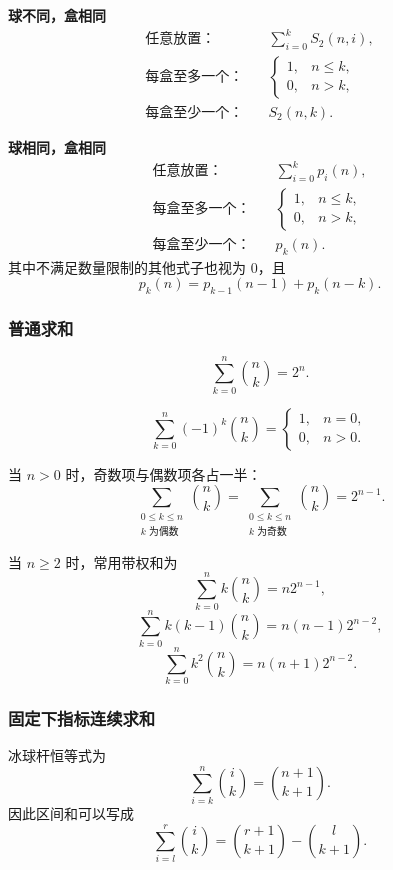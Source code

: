 \textbf{球不同，盒相同}
\[
\begin{aligned}
  \text{任意放置：}&\quad \sum_{i=0}^{k}S_2(n,i),\\
  \text{每盒至多一个：}&\quad
    \begin{cases}1,&n\le k,\\0,&n>k,\end{cases}\\
  \text{每盒至少一个：}&\quad S_2(n,k).
\end{aligned}
\]

\textbf{球相同，盒相同}
\[
\begin{aligned}
  \text{任意放置：}&\quad \sum_{i=0}^{k}p_i(n),\\
  \text{每盒至多一个：}&\quad
    \begin{cases}1,&n\le k,\\0,&n>k,\end{cases}\\
  \text{每盒至少一个：}&\quad p_k(n).
\end{aligned}
\]
其中不满足数量限制的其他式子也视为 $0$，且
\[
  p_k(n)=p_{k-1}(n-1)+p_k(n-k).
\]

\subsubsection{普通求和}

\[
  \sum_{k=0}^{n}\binom{n}{k}=2^n.
\]

\[
  \sum_{k=0}^{n}(-1)^k\binom{n}{k}
  =
  \begin{cases}
    1,&n=0,\\
    0,&n>0.
  \end{cases}
\]

当 $n>0$ 时，奇数项与偶数项各占一半：
\[
  \sum_{\substack{0\le k\le n\\k\text{ 为偶数}}}\binom{n}{k}
  =
  \sum_{\substack{0\le k\le n\\k\text{ 为奇数}}}\binom{n}{k}
  =2^{n-1}.
\]

当 $n\ge 2$ 时，常用带权和为
\[
  \sum_{k=0}^{n}k\binom{n}{k}=n2^{n-1},
\]
\[
  \sum_{k=0}^{n}k(k-1)\binom{n}{k}
  =n(n-1)2^{n-2},
\]
\[
  \sum_{k=0}^{n}k^2\binom{n}{k}
  =n(n+1)2^{n-2}.
\]

\subsubsection{固定下指标连续求和}

冰球杆恒等式为
\[
  \sum_{i=k}^{n}\binom{i}{k}=\binom{n+1}{k+1}.
\]
因此区间和可以写成
\[
  \sum_{i=l}^{r}\binom{i}{k}
  =\binom{r+1}{k+1}-\binom{l}{k+1}.
\]

